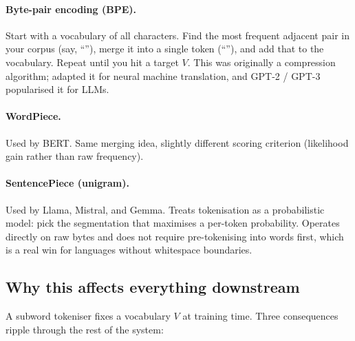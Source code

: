 \paragraph{Byte-pair encoding (BPE).} Start with a vocabulary of all
characters. Find the most frequent adjacent pair in your corpus
(say, ``''), merge it into a single token (``''), and add
that to the vocabulary. Repeat until you hit a target \(V\). This was
originally a compression algorithm; \citet{sennrich2016bpe} adapted it for
neural machine translation, and GPT-2 / GPT-3 popularised it for
LLMs.

\paragraph{WordPiece.} Used by BERT. Same merging idea, slightly different
scoring criterion (likelihood gain rather than raw frequency).

\paragraph{SentencePiece (unigram).} Used by Llama, Mistral, and Gemma.
Treats tokenisation as a probabilistic model: pick the segmentation that
maximises a per-token probability. Operates directly on raw bytes and does
not require pre-tokenising into words first, which is a real win for
languages without whitespace boundaries.

\subsection{Why this affects everything downstream}

A subword tokeniser fixes a vocabulary \(V\) at training time. Three
consequences ripple through the rest of the system:

